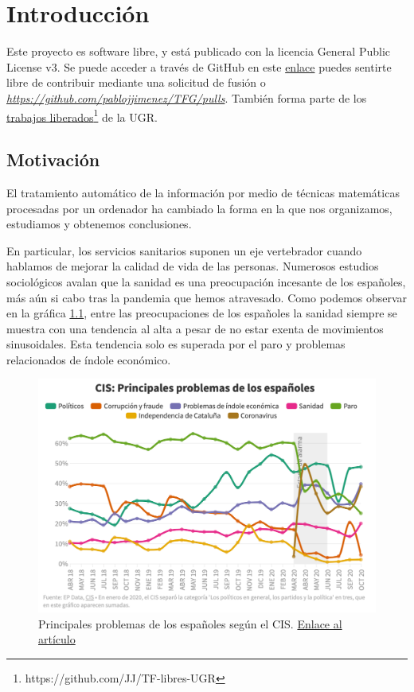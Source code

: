 \chapter{Introducción}
Este proyecto es software libre, y está publicado con la licencia \cite{gplv3} General Public License v3.
Se puede acceder a través de GitHub en este \href{https://github.com/pablojjimenez/TFG}{enlace} puedes sentirte libre de contribuir mediante una solicitud de fusión o \textit{\href{Pull Request}{https://github.com/pablojjimenez/TFG/pulls}}. También forma parte de los \href{https://github.com/JJ/TF-libres-UGR}{trabajos liberados}\footnote{https://github.com/JJ/TF-libres-UGR} de la UGR.

\section{Motivación} 
El tratamiento automático de la información por medio de técnicas matemáticas procesadas por un ordenador ha cambiado la forma en la que nos organizamos, estudiamos y obtenemos conclusiones.

En particular, los servicios sanitarios suponen un eje vertebrador cuando hablamos de mejorar la calidad de vida de las personas. Numerosos estudios sociológicos avalan que la sanidad es una preocupación incesante de los españoles, más aún si cabo tras la pandemia que hemos atravesado.
Como podemos observar en la gráfica \ref{fig:problemascis}, entre las preocupaciones de los españoles la sanidad siempre se muestra con una tendencia al alta a pesar de no estar exenta de movimientos sinusoidales. Esta tendencia solo es superada por el paro y problemas relacionados de índole económico.
\FloatBarrier
\begin{figure}[]
	\centering	
	\includegraphics[scale=0.5]{doc/logos/imgs/CIS_1.png}
	\caption{ 
        Principales problemas de los españoles según el CIS. \href{https://www.rtve.es/noticias/20201015/crisis-economica-coronavirus-preocupan-ahora-mas-espanoles-paro/2045610.shtml}{Enlace al artículo}
    }
    \label{fig:problemascis}
\end{figure}
\FloatBarrier

